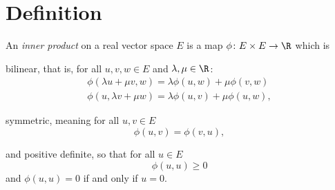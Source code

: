 \documentclass[12pt,oneside]{book}
\begin{document}
\section{Definition}
\begin{definition}
	An \emph{inner product} on a real vector space \( E \) is a map \( \phi \colon E \times
	E \to \R \) which is
	\begin{points}
	\item bilinear, that is, for all \( u, v, w \in E \) and \( \lambda, \mu \in \R \):
		\begin{gather*}
			\phi(\lambda u + \mu v, w) = \lambda \phi(u,w) + \mu \phi(v,w) \\
			\phi(u, \lambda v + \mu w) = \lambda \phi(u, v) + \mu \phi(u,w),
		\end{gather*}
		
	\item symmetric, meaning for all \( u, v \in E \)
		\begin{equation*}
			\phi(u,v) = \phi(v,u),
		\end{equation*}
		
	\item and positive definite, so that for all \( u \in E \) 
		\begin{equation*}
			\phi(u,u) \geq 0
		\end{equation*}
		and \( \phi(u,u) = 0 \) if and only if \( u = 0 \).
	\end{points}
\end{definition}
\end{document}

